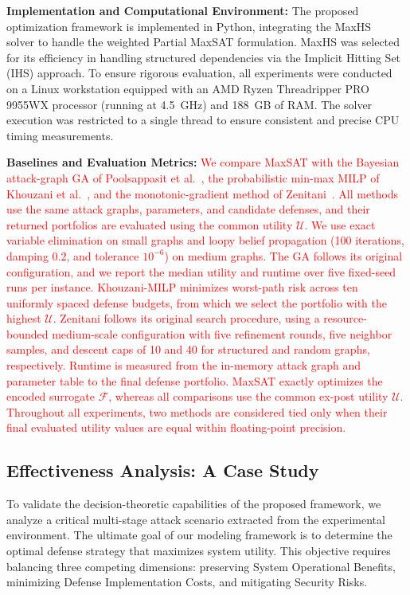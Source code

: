 \documentclass[conference]{IEEEtran}
\theoremstyle{definition} %
\theoremstyle{plain} %
\begin{document}
\textbf{Implementation and Computational Environment:} 
The proposed optimization framework is implemented in Python, integrating the MaxHS~\cite{davies2011solving} solver to handle the weighted Partial MaxSAT formulation. MaxHS was selected for its efficiency in handling structured dependencies via the Implicit Hitting Set (IHS) approach. To ensure rigorous evaluation, all experiments were conducted on a Linux workstation equipped with an AMD Ryzen Threadripper PRO 9955WX processor (running at 4.5~GHz) and 188~GB of RAM. The solver execution was restricted to a single thread to ensure consistent and precise CPU timing measurements.

\textbf{Baselines and Evaluation Metrics:}
\textcolor{red}{We compare MaxSAT with the Bayesian attack-graph GA of Poolsappasit et al.~\cite{poolsappasit2011dynamic}, the probabilistic min-max MILP of Khouzani et al.~\cite{KHOUZANI2019894}, and the monotonic-gradient method of Zenitani~\cite{zenitani2022multi}. All methods use the same attack graphs, parameters, and candidate defenses, and their returned portfolios are evaluated using the common utility $\mathcal{U}$. We use exact variable elimination on small graphs and loopy belief propagation (100 iterations, damping 0.2, and tolerance $10^{-6}$) on medium graphs. The GA follows its original configuration, and we report the median utility and runtime over five fixed-seed runs per instance. Khouzani-MILP minimizes worst-path risk across ten uniformly spaced defense budgets, from which we select the portfolio with the highest $\mathcal{U}$. Zenitani follows its original search procedure, using a resource-bounded medium-scale configuration with five refinement rounds, five neighbor samples, and descent caps of 10 and 40 for structured and random graphs, respectively. Runtime is measured from the in-memory attack graph and parameter table to the final defense portfolio. MaxSAT exactly optimizes the encoded surrogate $\mathcal{F}$, whereas all comparisons use the common ex-post utility $\mathcal{U}$. Throughout all experiments, two methods are considered tied only when their final evaluated utility values are equal within floating-point precision.}

\subsection{Effectiveness Analysis: A Case Study}
\label{subsec:case_study}

To validate the decision-theoretic capabilities of the proposed framework, we analyze a critical multi-stage attack scenario extracted from the experimental environment. The ultimate goal of our modeling framework is to determine the optimal defense strategy that maximizes system utility. This objective requires balancing three competing dimensions: preserving System Operational Benefits, minimizing Defense Implementation Costs, and mitigating Security Risks.
\end{document}
